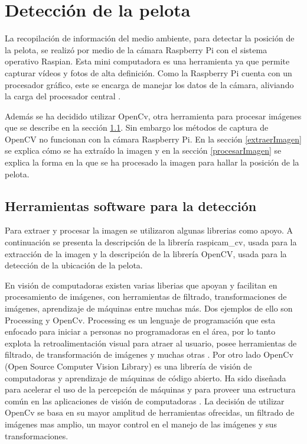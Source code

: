 \section{Detección de la pelota}\label{chapter:deteccion}

La recopilación de información del medio ambiente, para detectar la posición de la pelota, se realiz\'o por medio de la cámara Raspberry Pi con el sistema operativo Raspian. Esta mini computadora es una herramienta ya que permite capturar v\'ideos y fotos de alta definici\'on. Como la Raspberry Pi cuenta con un procesador gr\'afico, este se encarga de manejar los datos de la cámara, aliviando la carga del procesador central \cite{raspCamArti}.

Además se ha decidido utilizar OpenCv, otra herramienta para procesar im\'agenes que se describe en la sección \ref{herramientasDetc}. Sin embargo los métodos de captura de OpenCV no funcionan con la c\'amara Raspberry Pi. En la secci\'on \ref{extraerImagen} se explica c\'omo se ha extra\'ido la imagen y en la secci\'on \ref{procesarImagen} se explica la forma en la que se ha procesado la imagen para hallar la posición de la pelota. 

\subsection{Herramientas software para la detecci\'on }\label{herramientasDetc}

Para extraer y procesar la imagen se utilizaron algunas librerias como apoyo. A continuación se presenta la descripción de la librería raspicam\_cv, usada para la extracción de la imagen y la descripción de la librería OpenCV, usada para la detección de la ubicación de la pelota.   

En visi\'on de computadoras existen varias liberias que apoyan y facilitan en procesamiento de im\'agenes, con herramientas de filtrado, transformaciones de im\'agenes, aprendizaje de m\'aquinas entre muchas m\'as. Dos ejemplos de ello son Processing y OpenCv. Processing es un lenguaje de programaci\'on que esta enfocado para iniciar a personas no programadoras en el \'area, por lo tanto explota la retroalimentaci\'on visual para atraer al usuario, posee herramientas de filtrado, de transformaci\'on de im\'agenes y muchas otras \cite{processing}.
Por otro lado OpenCv (Open Source Computer Vision Library) es una librería de visión de computadoras y aprendizaje de máquinas de código abierto. Ha sido diseñada para acelerar el uso de la percepción de m\'aquinas y para proveer una estructura común en las aplicaciones de visión de computadoras \cite{opencv}. La decisi\'on de utilizar OpenCv se basa en su mayor amplitud de herramientas ofrecidas, un filtrado de im\'agenes mas amplio, un mayor control en el manejo de las im\'agenes y sus transformaciones.

